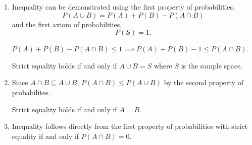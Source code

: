 \begin{enumerate}[label=(\alph*)]

\item Inequality can be demonstrated using the first property of probabilities,
$$P(A \cup B) = P(A) + P(B) - P(A \cap B)$$ and the first axiom of probabilities,
$$P(S) = 1.$$

$P(A) + P(B) - P(A \cap B) \leq 1 \implies P(A) + P(B) - 1 \leq P(A \cap B)$. 

Strict equality holds if and only if $A \cup B = S$ where $S$ is the sample space.

\item Since $A \cap B \subseteq A \cup B$, $P(A \cap B) \leq P(A \cup B)$ by the second property of probabilites.

Strict equality holds if and only if $A = B.$

\item Inequality follows directly from the first property of probabilities with strict equality if and only if $P(A \cap B) = 0.$

\end{enumerate}